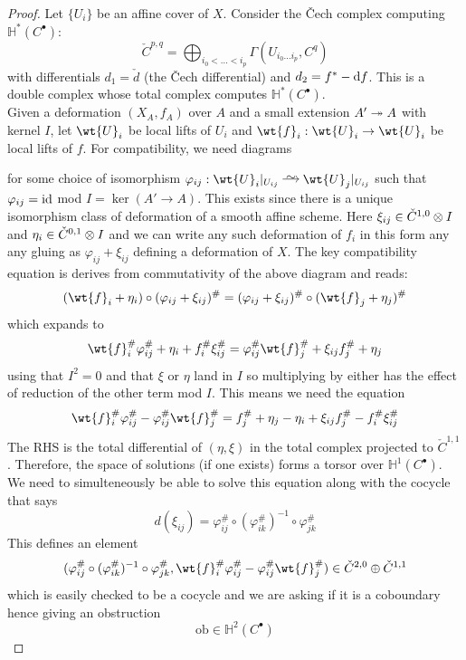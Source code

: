 \documentclass[12pt]{article}
\newcommand{\HH}{\mathbb{H}}
\newcommand{\ob}{\mathrm{ob}}
\begin{document}
\begin{proof}
Let $\{U_i\}$ be an affine cover of $X$. Consider the Čech complex computing $\HH^*(C^\bullet)$:
\[ \check{C}^{p,q} = \bigoplus_{i_0 < \dots < i_p} \Gamma(U_{i_0\ldots i_p}, C^q) \]
with differentials $d_1 = \check{d}$ (the Čech differential) and $d_2 = f^* - \mathrm{d}{f}$. This is a double complex whose total complex computes $\HH^*(C^\bullet)$.
\bigskip\\
Given a deformation $(X_A, f_A)$ over $A$ and a small extension $A' \twoheadrightarrow A$ with kernel $I$, let $\wt{U}_i$ be local lifts of $U_i$ and $\wt{f}_i : \wt{U}_i \to \wt{U}_i$ be local lifts of $f$. For compatibility, we need diagrams
\begin{center}
\end{center}
for some choice of isomorphism $\varphi_{ij} : \wt{U}_i|_{U_{ij}} \iso \wt{U}_j |_{U_{ij}}$ such that $\varphi_{ij} = \mathrm{id}$ mod $I = \ker{(A' \to A)}$. This exists since there is a unique isomorphism class of deformation of a smooth affine scheme. Here $\xi_{ij} \in \check{C}^{1,0} \otimes I$ and $\eta_i \in \check{C}^{0,1} \otimes I$ and we can write any such deformation of $f_i$ in this form any any gluing as $\varphi_{ij} + \xi_{ij}$ defining a deformation of $X$. The key compatibility equation is derives from commutativity of the above diagram and reads:
\[ (\wt{f}_i + \eta_i) \circ (\varphi_{ij} + \xi_{ij})^\# = (\varphi_{ij} + \xi_{ij})^\# \circ (\wt{f}_j + \eta_j)^\# \]
which expands to
\[ \wt{f}_i^\# \varphi_{ij}^\# + \eta_i + f_i^\# \xi_{ij}^\# = \varphi_{ij}^\# \wt{f}_j^\# + \xi_{ij} f_j^\# + \eta_j \]
using that $I^2 = 0$ and that $\xi$ or $\eta$ land in $I$ so multiplying by either has the effect of reduction of the other term mod $I$. This means we need the equation
\[ \wt{f}_i^\# \varphi_{ij}^\# - \varphi_{ij}^\#\wt{f}_j^\# = f_j^\# + \eta_j - \eta_i + \xi_{ij} f_j^\#  -  f_i^\# \xi_{ij}^\# \]
The RHS is the total differential of $(\eta, \xi)$ in the total complex projected to $\check{C}^{1,1}$. Therefore, the space of solutions (if one exists) forms a torsor over $\HH^1(C^\bullet)$. We need to simulteneously be able to solve this equation along with the cocycle that says
\[ d(\xi_{ij}) = \varphi_{ij}^{\#} \circ (\varphi_{ik}^{\#})^{-1} \circ \varphi_{jk}^{\#} \]
This defines an element 
\[ (\varphi_{ij}^{\#} \circ (\varphi_{ik}^{\#})^{-1} \circ \varphi_{jk}^{\#}, \wt{f}_i^\# \varphi_{ij}^\# - \varphi_{ij}^\#\wt{f}_j^\#) \in \check{C}^{2,0} \oplus \check{C}^{1,1} \]
which is easily checked to be a cocycle and we are asking if it is a coboundary hence giving an obstruction
\[ \ob \in \HH^2(C^\bullet) \]
\end{proof}
\end{document}
